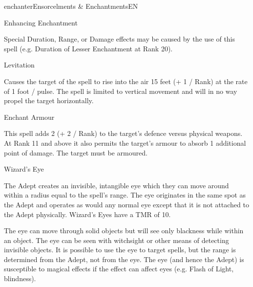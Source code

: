 \begin{College}[1.1]{enchanter}{Ensorcelments \& Enchantments}{EN}
\begin{spell}[S-7]{Enhancing Enchantment}
\begin{effects}
Special Duration, Range, or Damage effects may be caused by the use of
this spell (e.g. Duration of Lesser Enchantment at Rank 20).
\end{effects}
\end{spell}

\begin{spell}[S-8]{Levitation}

\begin{effects}
Causes the target of the spell to rise into the air 15 feet (+ 1 /
Rank) at the rate of 1 foot / pulse.  The spell is limited to vertical
movement and will in no way propel the target horizontally.
\end{effects}
\end{spell}

\begin{spell}[S-9]{Enchant Armour}

\begin{effects}
This spell adds 2 (+ 2 / Rank) to the target’s defence versus physical
weapons.  At Rank 11 and above it also permits the target’s armour to
absorb 1 additional point of damage.  The target must be armoured.
\end{effects}
\end{spell}

\begin{spell}[S-10]{Wizard’s Eye}
\begin{effects}
The Adept creates an invisible, intangible eye which they can move
around within a radius equal to the spell’s range. The eye originates
in the same spot as the Adept and operates as would any normal eye
except that it is not attached to the Adept physically.  Wizard’s Eyes
have a TMR of 10.

The eye can move through solid objects but will see only blackness
while within an object. The eye can be seen with witchsight or other
means of detecting invisible objects. It is possible to use the eye to
target spells, but the range is determined from the Adept, not from
the eye.  The eye (and hence the Adept) is susceptible to magical
effects if the effect can affect eyes (e.g.  Flash of Light,
blindness).
\end{effects}
\end{spell}


\end{College}
